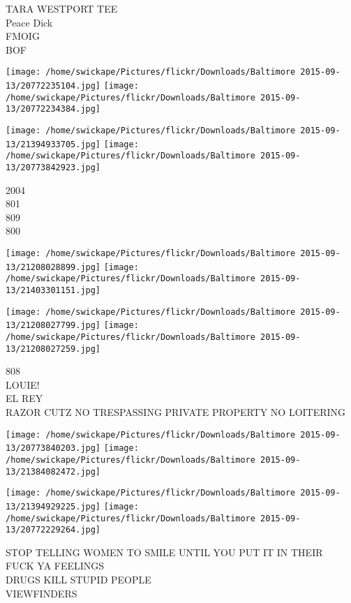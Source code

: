 \documentclass[10pt,letterpaper]{article}
\begin{document}
TARA WESTPORT TEE\\
Peace Dick\\
FMOIG\\
BOF\\
\pagebreak

\texttt{[image: /home/swickape/Pictures/flickr/Downloads/Baltimore 2015-09-13/20772235104.jpg]}
\texttt{[image: /home/swickape/Pictures/flickr/Downloads/Baltimore 2015-09-13/20772234384.jpg]}

\texttt{[image: /home/swickape/Pictures/flickr/Downloads/Baltimore 2015-09-13/21394933705.jpg]}
\texttt{[image: /home/swickape/Pictures/flickr/Downloads/Baltimore 2015-09-13/20773842923.jpg]}

2004\\
801\\
809\\
800\\
\pagebreak

\texttt{[image: /home/swickape/Pictures/flickr/Downloads/Baltimore 2015-09-13/21208028899.jpg]}
\texttt{[image: /home/swickape/Pictures/flickr/Downloads/Baltimore 2015-09-13/21403301151.jpg]}

\texttt{[image: /home/swickape/Pictures/flickr/Downloads/Baltimore 2015-09-13/21208027799.jpg]}
\texttt{[image: /home/swickape/Pictures/flickr/Downloads/Baltimore 2015-09-13/21208027259.jpg]}

808\\
LOUIE!\\
EL REY\\
RAZOR CUTZ NO TRESPASSING PRIVATE PROPERTY NO LOITERING\\
\pagebreak

\texttt{[image: /home/swickape/Pictures/flickr/Downloads/Baltimore 2015-09-13/20773840203.jpg]}
\texttt{[image: /home/swickape/Pictures/flickr/Downloads/Baltimore 2015-09-13/21384082472.jpg]}

\texttt{[image: /home/swickape/Pictures/flickr/Downloads/Baltimore 2015-09-13/21394929225.jpg]}
\texttt{[image: /home/swickape/Pictures/flickr/Downloads/Baltimore 2015-09-13/20772229264.jpg]}

STOP TELLING WOMEN TO SMILE UNTIL YOU PUT IT IN THEIR\\
FUCK YA FEELINGS\\
DRUGS KILL STUPID PEOPLE\\
VIEWFINDERS\\
\pagebreak
\end{document}
